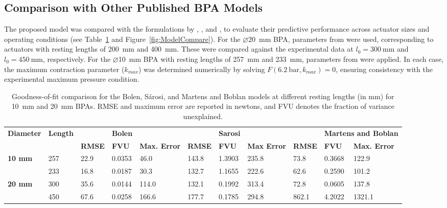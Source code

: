 \subsection{Comparison with Other Published BPA Models}

The proposed model was compared with the formulations by \citet{sarosi_new_2012}, \citet{sarosi_10mm}, and \citet{martens_modeling_2017}, to evaluate their predictive performance across actuator sizes and operating conditions (see Table~\ref{tab:model_compare} and Figure~\ref{fig:ModelCompare}).
For the $\diameter$\qty{20}{\mm} BPA, parameters from \citep{sarosi_new_2012} were used, corresponding to actuators with resting lengths of \qty{200}{\mm} and \qty{400}{\mm}. These were compared against the experimental data at $l_0=\qty{300}{\mm}$ and $l_0=\qty{450}{\mm}$, respectively. For the $\diameter$\qty{10}{\mm} BPA with resting lengths of \qty{257}{\mm} and \qty{233}{\mm}, parameters from \citep{sarosi_10mm} were applied. In each case, the maximum contraction parameter ($k_{max}$) was determined numerically by solving $F(\qty{6.2}{\bar}, k_{max}) = 0$, ensuring consistency with the experimental maximum pressure condition.




\begin{table}[H]
\caption{Goodness-of-fit comparison for the Bolen, Sárosi, and Martens and Boblan models at different resting lengths (in mm) for \qty{10}{\mm} and \qty{20}{\mm} BPAs. RMSE and maximum error are reported in newtons, and FVU denotes the fraction of variance unexplained.}
\label{tab:model_compare}
\tiny
\begin{adjustwidth}{-2cm}{0cm}
\begin{tabularx}{\textwidth}{@{}lllllllllll@{}}
\toprule
\textbf{Diameter} &
  \textbf{Length} &
  \textbf{} &
  \textbf{Bolen} &
  \textbf{} &
  \textbf{} &
  \textbf{Sarosi} &
  \textbf{} &
  \textbf{} &
  \multicolumn{2}{l}{\textbf{Martens and Boblan}} \\ 
\textbf{} &
  \textbf{} &
  \textbf{RMSE} &
  \textbf{FVU} &
  \textbf{Max. Error} &
  \textbf{RMSE} &
  \textbf{FVU} &
  \textbf{Max Error} &
  \textbf{RMSE} &
  \textbf{FVU} &
  \textbf{Max. Error} \\ \midrule
\textbf{10 mm} & 257 & 22.9 & 0.0353 & 46.0  & 143.8 & 1.3903 & 235.8 & 73.8  & 0.3668 & 122.9  \\
\textbf{}      & 233 & 16.8 & 0.0187 & 30.3  & 132.7 & 1.1655 & 222.6 & 62.6  & 0.2590 & 101.2  \\ \midrule
\textbf{20 mm} & 300 & 35.6 & 0.0144 & 114.0 & 132.1 & 0.1992 & 313.4 & 72.8  & 0.0605 & 137.8  \\
\textbf{}      & 450 & 67.6 & 0.0258 & 166.6 & 177.7 & 0.1785 & 294.8 & 862.1 & 4.2022 & 1321.1 \\ \bottomrule
\end{tabularx}
\end{adjustwidth}
\end{table}

